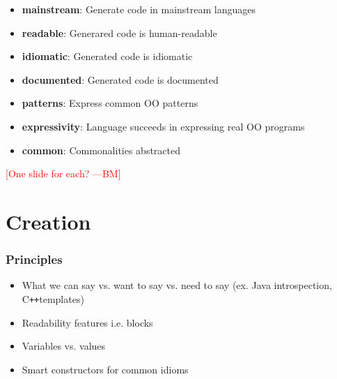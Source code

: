 \documentclass{beamer}
\newcommand{\authornote}[3]{\textcolor{#1}{[#3 ---#2]}}
\newcommand{\bmac}[1]{\authornote{red}{BM}{#1}}
\newcommand{\Cplusplus}{C\texttt{++}}
\begin{document}
\begin{frame}

\begin{itemize}
	\item \textbf{mainstream}: Generate code in mainstream languages
	\item \textbf{readable}: Generared code is human-readable
	\item \textbf{idiomatic}: Generated code is idiomatic
	\item \textbf{documented}: Generated code is documented
	\item \textbf{patterns}: Express common OO patterns
	\item \textbf{expressivity}: Language succeeds in expressing real OO 
	programs
	\item \textbf{common}: Commonalities abstracted
\end{itemize}

\bmac{One slide for each?}

\end{frame}


\section[Creation]{Creation}


\begin{frame}

\frametitle{Principles}

\begin{itemize}
	\item What we can say vs. want to say vs. need to say (ex. Java 
	introspection, \Cplusplus templates)
	\item Readability features i.e. blocks
	\item Variables vs. values
	\item Smart constructors for common idioms
\end{itemize}

\end{frame}

\end{document}
